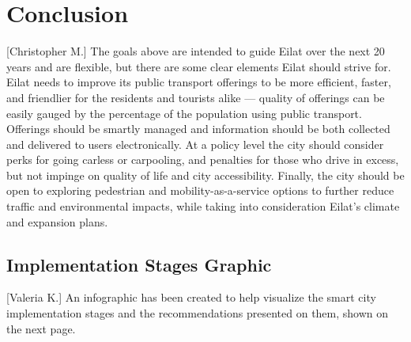 \documentclass[12pt]{article}                               %
\begin{document}
\section{Conclusion}[Christopher M.]\label{sec:conclusion}
The goals above are intended to guide Eilat over the next 20 years and are flexible, but there are some clear elements Eilat should strive for. Eilat needs to improve its public transport offerings to be more efficient, faster, and friendlier for the residents and tourists alike --- quality of offerings can be easily gauged by the percentage of the population using public transport. Offerings should be smartly managed and information should be both collected and delivered to users electronically. At a policy level the city should consider perks for going carless or carpooling, and penalties for those who drive in excess, but not impinge on quality of life and city accessibility. Finally, the city should be open to exploring pedestrian and mobility-as-a-service options to further reduce traffic and environmental impacts, while taking into consideration Eilat's climate and expansion plans.


\newpage
\doublespacing


\onehalfspacing
\newpage

\begin{appendices}
\section{Implementation Stages Graphic}[Valeria K.] \label{img:stages_graphic}
An infographic has been created to help visualize the smart city implementation stages and the recommendations presented on them, shown on the next page.

 
\end{appendices}
\end{document}
